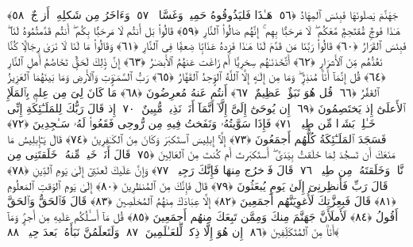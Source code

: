  جَهَنَّمَ يَصلَونَهَا فَبِئسَ ٱلمِهَادُ ﴿٥٦﴾
 هَـٰذَا فَليَذُوقُوهُ حَمِيمٌۭ وَغَسَّاقٌۭ ﴿٥٧﴾
 وَءَاخَرُ مِن شَكلِهِۦٓ أَزوَٟجٌ ﴿٥٨﴾
 هَـٰذَا فَوجٌۭ مُّقتَحِمٌۭ مَّعَكُم ۖ لَا مَرحَبًۢا بِهِم ۚ إِنَّهُم صَالُوا۟ ٱلنَّارِ ﴿٥٩﴾
 قَالُوا۟ بَل أَنتُم لَا مَرحَبًۢا بِكُم ۖ أَنتُم قَدَّمتُمُوهُ لَنَا ۖ فَبِئسَ ٱلقَرَارُ ﴿٦٠﴾
 قَالُوا۟ رَبَّنَا مَن قَدَّمَ لَنَا هَـٰذَا فَزِدهُ عَذَابًۭا ضِعفًۭا فِى ٱلنَّارِ ﴿٦١﴾
 وَقَالُوا۟ مَا لَنَا لَا نَرَىٰ رِجَالًۭا كُنَّا نَعُدُّهُم مِّنَ ٱلأَشرَارِ ﴿٦٢﴾
 أَتَّخَذنَـٰهُم سِخرِيًّا أَم زَاغَت عَنهُمُ ٱلأَبصَـٰرُ ﴿٦٣﴾
 إِنَّ ذَٟلِكَ لَحَقٌّۭ تَخَاصُمُ أَهلِ ٱلنَّارِ ﴿٦٤﴾
 قُل إِنَّمَآ أَنَا۠ مُنذِرٌۭ ۖ وَمَا مِن إِلَـٰهٍ إِلَّا ٱللَّهُ ٱلوَٟحِدُ ٱلقَهَّارُ ﴿٦٥﴾
 رَبُّ ٱلسَّمَـٰوَٟتِ وَٱلأَرضِ وَمَا بَينَهُمَا ٱلعَزِيزُ ٱلغَفَّٰرُ ﴿٦٦﴾
 قُل هُوَ نَبَؤٌا۟ عَظِيمٌ ﴿٦٧﴾
 أَنتُم عَنهُ مُعرِضُونَ ﴿٦٨﴾
 مَا كَانَ لِىَ مِن عِلمٍۭ بِٱلمَلَإِ ٱلأَعلَىٰٓ إِذ يَختَصِمُونَ ﴿٦٩﴾
 إِن يُوحَىٰٓ إِلَىَّ إِلَّآ أَنَّمَآ أَنَا۠ نَذِيرٌۭ مُّبِينٌ ﴿٧٠﴾
 إِذ قَالَ رَبُّكَ لِلمَلَـٰٓئِكَةِ إِنِّى خَـٰلِقٌۢ بَشَرًۭا مِّن طِينٍۢ ﴿٧١﴾
 فَإِذَا سَوَّيتُهُۥ وَنَفَختُ فِيهِ مِن رُّوحِى فَقَعُوا۟ لَهُۥ سَـٰجِدِينَ ﴿٧٢﴾
 فَسَجَدَ ٱلمَلَـٰٓئِكَةُ كُلُّهُم أَجمَعُونَ ﴿٧٣﴾
 إِلَّآ إِبلِيسَ ٱستَكبَرَ وَكَانَ مِنَ ٱلكَـٰفِرِينَ ﴿٧٤﴾
 قَالَ يَـٰٓإِبلِيسُ مَا مَنَعَكَ أَن تَسجُدَ لِمَا خَلَقتُ بِيَدَىَّ ۖ أَستَكبَرتَ أَم كُنتَ مِنَ ٱلعَالِينَ ﴿٧٥﴾
 قَالَ أَنَا۠ خَيرٌۭ مِّنهُ ۖ خَلَقتَنِى مِن نَّارٍۢ وَخَلَقتَهُۥ مِن طِينٍۢ ﴿٧٦﴾
 قَالَ فَٱخرُج مِنهَا فَإِنَّكَ رَجِيمٌۭ ﴿٧٧﴾
 وَإِنَّ عَلَيكَ لَعنَتِىٓ إِلَىٰ يَومِ ٱلدِّينِ ﴿٧٨﴾
 قَالَ رَبِّ فَأَنظِرنِىٓ إِلَىٰ يَومِ يُبعَثُونَ ﴿٧٩﴾
 قَالَ فَإِنَّكَ مِنَ ٱلمُنظَرِينَ ﴿٨٠﴾
 إِلَىٰ يَومِ ٱلوَقتِ ٱلمَعلُومِ ﴿٨١﴾
 قَالَ فَبِعِزَّتِكَ لَأُغوِيَنَّهُم أَجمَعِينَ ﴿٨٢﴾
 إِلَّا عِبَادَكَ مِنهُمُ ٱلمُخلَصِينَ ﴿٨٣﴾
 قَالَ فَٱلحَقُّ وَٱلحَقَّ أَقُولُ ﴿٨٤﴾
 لَأَملَأَنَّ جَهَنَّمَ مِنكَ وَمِمَّن تَبِعَكَ مِنهُم أَجمَعِينَ ﴿٨٥﴾
 قُل مَآ أَسـَٔلُكُم عَلَيهِ مِن أَجرٍۢ وَمَآ أَنَا۠ مِنَ ٱلمُتَكَلِّفِينَ ﴿٨٦﴾
 إِن هُوَ إِلَّا ذِكرٌۭ لِّلعَـٰلَمِينَ ﴿٨٧﴾
 وَلَتَعلَمُنَّ نَبَأَهُۥ بَعدَ حِينٍۭ ﴿٨٨﴾
 
